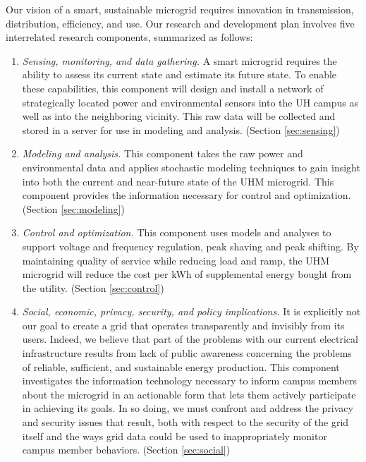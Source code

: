 Our vision of a smart, sustainable microgrid requires innovation in
transmission, distribution, efficiency, and use.  Our research and
development plan involves five interrelated research components, summarized
as follows:

\begin{enumerate}

\item {\em Sensing, monitoring, and data gathering.} A smart microgrid requires the
  ability to assess its current state and estimate its future state.  To
  enable these capabilities, this component will design and install a
  network of strategically located power and environmental sensors into the
  UH campus as well as into the neighboring vicinity. This raw data will be
  collected and stored in a server for use in modeling and
  analysis. (Section \ref{sec:sensing})

\item {\em Modeling and analysis.}  This component takes the raw power and
  environmental data and applies stochastic modeling techniques to gain
  insight into both the current and near-future state of the UHM microgrid.  This
  component provides the information necessary for control and
  optimization. (Section \ref{sec:modeling})

\item {\em Control and optimization.}  This component uses models and
  analyses to support voltage and frequency regulation, peak shaving and
  peak shifting.  By maintaining quality of service while reducing load and
  ramp, the UHM microgrid will reduce the cost per kWh of
  supplemental energy bought from the utility. (Section \ref{sec:control})

\item {\em Social, economic, privacy, security, and policy implications.}
  It is explicitly not our goal to create a grid that operates
  transparently and invisibly from its users.  Indeed, we believe that part
  of the problems with our current electrical infrastructure results from
  lack of public awareness concerning the problems of reliable, sufficient,
  and sustainable energy production.  This component investigates the
  information technology necessary to inform campus members about the
  microgrid in an actionable form that lets them actively participate in
  achieving its goals.  In so doing, we must confront and address the
  privacy and security issues that result, both with respect to the
  security of the grid itself and the ways grid data could be used to
  inappropriately monitor campus member behaviors. (Section \ref{sec:social})


\end{enumerate}
